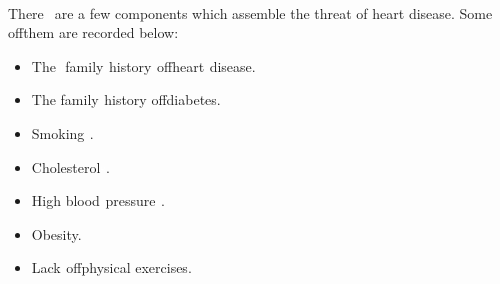 \documentclass[oneside,12pt]{Classes/VTU}
\begin{document}
    \paragraph{}
    There \tiny\textcolor{white}{c}\normalsize are a few components which assemble the threat of heart disease. Some of\tiny\textcolor{white}{f}\normalsize them are recorded below$:$
    \begin{itemize}
    	\item The\tiny\textcolor{white}{ir}\normalsize family\tiny\textcolor{white}{s}\normalsize history\tiny\textcolor{white}{s}\normalsize of\tiny\textcolor{white}{f}\normalsize heart\tiny\textcolor{white}{s}\normalsize disease.
    	\item The family\tiny\textcolor{white}{s}\normalsize history of\tiny\textcolor{white}{f}\normalsize diabetes.
    	\item Smoking\tiny\textcolor{white}{s}\normalsize.
    	\item Cholesterol\tiny\textcolor{white}{s}\normalsize.
    	\item High blood\tiny\textcolor{white}{s}\normalsize pressure\tiny\textcolor{white}{s}\normalsize.
    	\item Obesity.
    	\item Lack\tiny\textcolor{white}{s}\normalsize of\tiny\textcolor{white}{f}\normalsize physical exercises.
    \end{itemize}
\end{document}

